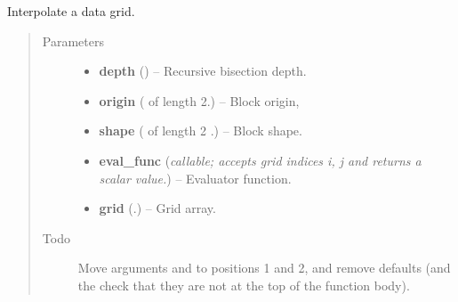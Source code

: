 \documentclass[letterpaper,10pt,english]{sphinxmanual}
\begin{document}
\begin{fulllineitems}
\label{docs/utilities:blrb.interpolate_grid}
Interpolate a data grid.
\begin{quote}\begin{description}
\item[{Parameters}] \leavevmode\begin{itemize}
\item {} 
\textbf{depth} () -- Recursive bisection depth.

\item {} 
\textbf{origin} ( of length 2.) -- Block origin,

\item {} 
\textbf{shape} ( of length 2 .) -- Block shape.

\item {} 
\textbf{eval\_func} (\emph{callable; accepts grid indices i, j and returns a scalar value.}) -- Evaluator function.

\item {} 
\textbf{grid} (.) -- Grid array.

\end{itemize}

\item[{Todo }] \leavevmode
Move arguments  and  to positions 1 and 2, and
remove defaults (and the check that they are not  at the top
of the function body).

\end{description}\end{quote}

\end{fulllineitems}


\end{document}
